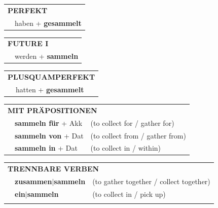 \documentclass[10pt,a4paper]{revtex4-2}
\begin{document}
\begin{verbbox-acc}
 \vspace{10pt}

 \begin{tabular}{rl}
     \multicolumn{2}{l}{\textbf{PERFEKT}}\\
   & haben + \textbf{gesammelt}\\
  \end{tabular}
\hfill
\begin{tabular}{rl}
    \multicolumn{2}{l}{\textbf{FUTURE I}}\\
   & werden + \textbf{sammeln}\\
  \end{tabular}
\hfill
\begin{tabular}{rl}
    \multicolumn{2}{l}{\textbf{PLUSQUAMPERFEKT}}\\
   & hatten + \textbf{gesammelt}\\
  \end{tabular}

 \vspace{10pt}

\begin{tabular}{lll}
      \multicolumn{3}{l}{\textbf{MIT PRÄPOSITIONEN}}\\
& \textbf{sammeln für} + Akk & (to collect for / gather for)\\
& \textbf{sammeln von} + Dat & (to collect from / gather from)\\
& \textbf{sammeln in} + Dat & (to collect in / within)\\
\end{tabular}
  \hfill
\begin{tabular}{lll}
      \multicolumn{3}{l}{\textbf{TRENNBARE VERBEN}}\\
 & \textbf{zusammen$|$sammeln} & (to gather together / collect together)\\
 & \textbf{ein$|$sammeln} & (to collect in / pick up)\\
\vspace{10pt}
  \end{tabular}

  \vspace{-5pt}


\end{verbbox-acc}
\end{document}
